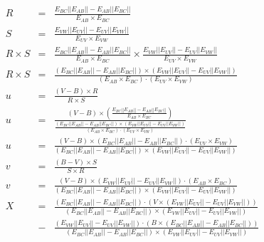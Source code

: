 \documentclass[12pt,a4paper,oneside,openany]{article}
\begin{document}
\begin{eqnarray*}
R &=& \frac{E_{BC} || E_{AB} || - E_{AB}|| E_{BC} ||}{E_{AB} \times E_{BC}} \\
S &=& \frac{E_{VW} || E_{UV} || - E_{UV}|| E_{VW} ||}{E_{UV} \times E_{VW}} \\
R \times S &=& \frac{E_{BC} || E_{AB} || - E_{AB}|| E_{BC} ||}{E_{AB} \times E_{BC}} \times \frac{E_{VW} || E_{UV} || - E_{UV}|| E_{VW} ||}{E_{UV} \times E_{VW}} \\
R \times S &=& \frac{(E_{BC} || E_{AB} || - E_{AB}|| E_{BC} ||) \times (E_{VW} || E_{UV} || - E_{UV}|| E_{VW} ||)}{(E_{AB} \times E_{BC}) \cdot (E_{UV} \times E_{VW})} \\
u &=& \frac{(V-B) \times R}{R \times S} \\
u &=& \frac{(V-B) \times \left( \frac{E_{BC} || E_{AB} || - E_{AB}|| E_{BC} ||}{E_{AB} \times E_{BC}}\right)}{\frac{(E_{BC} || E_{AB} || - E_{AB}|| E_{BC} ||) \times (E_{VW} || E_{UV} || - E_{UV}|| E_{VW} ||)}{(E_{AB} \times E_{BC}) \cdot (E_{UV} \times E_{VW})}} \\
u &=& \frac{(V-B) \times \left( {E_{BC} || E_{AB} || - E_{AB}|| E_{BC} ||}\right) \cdot (E_{UV} \times E_{VW})}{(E_{BC} || E_{AB} || - E_{AB}|| E_{BC} ||) \times (E_{VW} || E_{UV} || - E_{UV}|| E_{VW} ||)} \\
v &=& \frac{(B-V) \times S}{S \times R} \\
v &=& \frac{(V-B) \times \left( {E_{VW} || E_{UV} || - E_{UV}|| E_{VW} ||}\right) \cdot (E_{AB} \times E_{BC})}{(E_{BC} || E_{AB} || - E_{AB}|| E_{BC} ||) \times (E_{VW} || E_{UV} || - E_{UV}|| E_{VW} ||)} \\
X &=& \frac{(E_{BC} || E_{AB} || - E_{AB}|| E_{BC} ||) \cdot (V \times (E_{VW} || E_{UV} || - E_{UV}|| E_{VW} ||)) }{(E_{BC} || E_{AB} || - E_{AB}|| E_{BC} ||) \times (E_{VW} || E_{UV} || - E_{UV}|| E_{VW} ||)} \\
  &-& \frac{(E_{VW} || E_{UV} || - E_{UV}|| E_{VW} ||) \cdot (B \times (E_{BC} || E_{AB} || - E_{AB}|| E_{BC} ||)) }{(E_{BC} || E_{AB} || - E_{AB}|| E_{BC} ||) \times (E_{VW} || E_{UV} || - E_{UV}|| E_{VW} ||)}
\end{eqnarray*}
\end{document}
